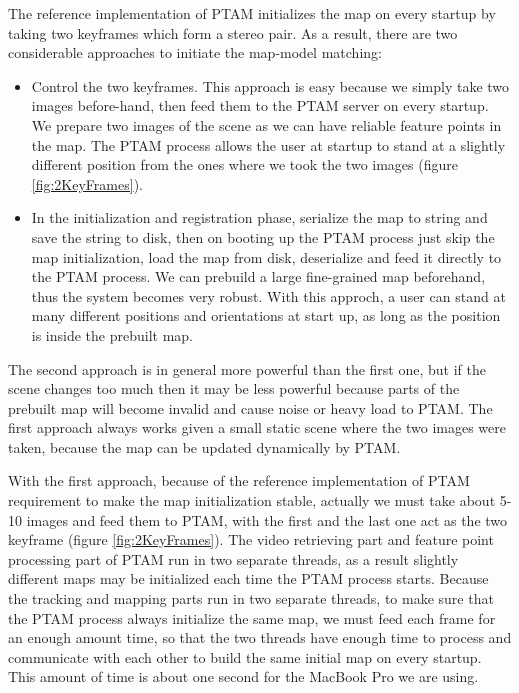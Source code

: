 The reference implementation of PTAM initializes the map on every startup by taking two keyframes which form a stereo pair. As a result, there are two considerable approaches to initiate the map-model matching:

\begin{itemize}
	\item Control the two keyframes. This approach is easy because we simply take two images before-hand, then feed them to the PTAM server on every startup. We prepare two images of the scene as we can have reliable feature points in the map. The PTAM process allows the user at startup to stand at a slightly different position from the ones where we took the two images (figure \ref{fig:2KeyFrames}).
	\item In the initialization and registration phase, serialize the map to string and save the string to disk, then on booting up the PTAM process just skip the map initialization, load the map from disk, deserialize and feed it directly to the PTAM process. We can prebuild a large fine-grained map beforehand, thus the system becomes very robust. With this approch, a user can stand at many different positions and orientations at start up, as long as the position is inside the prebuilt map.
\end{itemize}

The second approach is in general more powerful than the first one, but if the scene changes too much then it may be less powerful because parts of the prebuilt map will become invalid and cause noise or heavy load to PTAM. The first approach always works given a small static scene where the two images were taken, because the map can be updated dynamically by PTAM.

With the first approach, because of the reference implementation of PTAM requirement to make the map initialization stable, actually we must take about 5-10 images and feed them to PTAM, with the first and the last one act as the two keyframe (figure \ref{fig:2KeyFrames}). The video retrieving part and feature point processing part of PTAM run in two separate threads, as a result slightly different maps may be initialized each time the PTAM process starts. Because the tracking and mapping parts run in two separate threads, to make sure that the PTAM process always initialize the same map, we must feed each frame for an enough amount time, so that the two threads have enough time to process and communicate with each other to build the same initial map on every startup. This amount of time is about one second for the MacBook Pro we are using.


